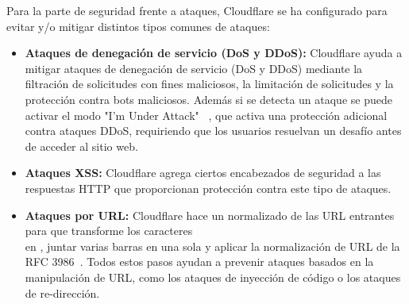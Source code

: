 Para la parte de seguridad frente a ataques, Cloudflare se ha configurado para evitar y/o mitigar distintos tipos comunes de ataques:
\begin{itemize}
    \item \textbf{Ataques de denegación de servicio (DoS y DDoS):} Cloudflare ayuda a mitigar ataques de denegación de servicio (DoS y DDoS) mediante la filtración de solicitudes con fines maliciosos, la limitación de solicitudes y la protección contra bots maliciosos. Además si se detecta un ataque se puede activar el modo "I'm Under Attack" ~\cite{CloudflareTeam2025}, que activa una protección adicional contra ataques DDoS, requiriendo que los usuarios resuelvan un desafío antes de acceder al sitio web.
    
    \item \textbf{Ataques XSS:} Cloudflare agrega ciertos encabezados de seguridad a las respuestas HTTP que proporcionan protección contra este tipo de ataques.

    \item \textbf{Ataques por URL:} Cloudflare hace un normalizado de las URL entrantes para que transforme los caracteres \\ en \/, juntar varias barras en una sola y aplicar la normalización de URL de la RFC 3986~\cite{CloudflareTeam2024}.    
    Todos estos pasos ayudan a prevenir ataques basados en la manipulación de URL, como los ataques de inyección de código o los ataques de re-dirección.
\end{itemize}

